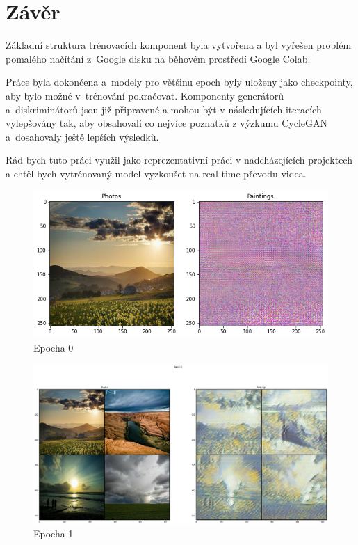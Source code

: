 \documentclass[czech]{mvi-report}
\begin{document}
\section{Závěr}

Základní struktura trénovacích komponent byla vytvořena a byl vyřešen problém pomalého načítání z~Google disku na běhovém prostředí Google Colab.

Práce byla dokončena a~modely pro většinu epoch byly uloženy jako checkpointy, aby bylo možné v~trénování pokračovat.
Komponenty generátorů a~diskriminátorů jsou již připravené a mohou být v následujících iteracích vylepšovány tak, aby obsahovali co nejvíce poznatků z výzkumu CycleGAN a~dosahovaly ještě lepších výsledků.

Rád bych tuto práci využil jako reprezentativní práci v nadcházejících projektech a chtěl bych vytrénovaný model vyzkoušet na real-time převodu videa. 


%


\begin{figure}[h!]
  \centering\leavevmode
  \includegraphics[width=1\linewidth]{img/epochs/e00}\vskip-0.5cm
  \caption{Epocha 0}
  \label{fig:epoch-0}
\end{figure}

\begin{figure}[h!]
  \centering\leavevmode
  \includegraphics[width=1\linewidth]{img/epochs/e01}\vskip-0.5cm
  \caption{Epocha 1}
  \label{fig:epoch-1}
\end{figure}
\end{document}
